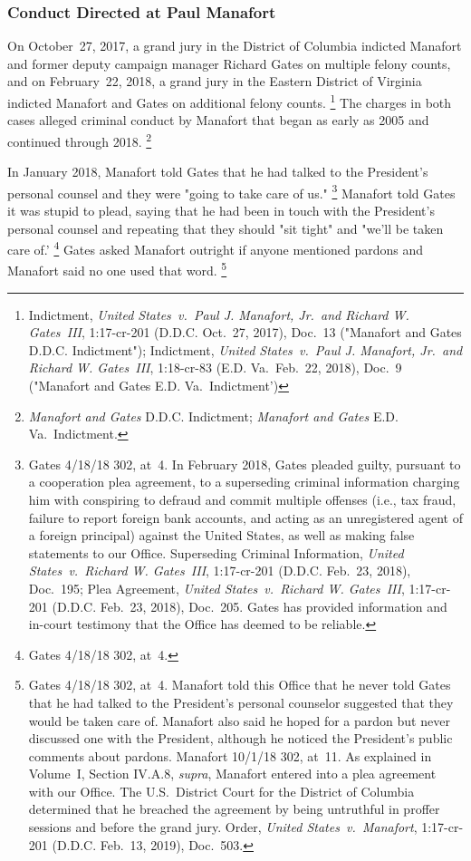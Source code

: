 \subsubsection{Conduct Directed at Paul Manafort}

On October~27, 2017, a grand jury in the District of Columbia indicted Manafort and former deputy campaign manager Richard Gates on multiple felony counts, and on February~22, 2018, a grand jury in the Eastern District of Virginia indicted Manafort and Gates on additional felony counts.%
\footnote{Indictment, \textit{United States~v.\ Paul J. Manafort, Jr.\ and Richard W. Gates~III}, 1:17-cr-201 (D.D.C. Oct.~27, 2017), Doc.~13 ("Manafort and Gates D.D.C. Indictment");
Indictment, \textit{United States~v.\ Paul J. Manafort, Jr.\ and Richard W. Gates~III}, 1:18-cr-83 (E.D. Va.\ Feb.~22, 2018), Doc.~9 ("Manafort and Gates E.D. Va.\ Indictment')}
The charges in both cases alleged criminal conduct by Manafort that began as early as 2005 and continued through 2018.%
\footnote{\textit{Manafort and Gates} D.D.C. Indictment; \textit{Manafort and Gates} E.D. Va.\ Indictment.}

In January 2018, Manafort told Gates that he had talked to the President's personal counsel and they were "going to take care of us."%
\footnote{Gates 4/18/18 302, at~4.
In February 2018, Gates pleaded guilty, pursuant to a cooperation plea agreement, to a superseding criminal information charging him with conspiring to defraud and commit multiple offenses (i.e., tax fraud, failure to report foreign bank accounts, and acting as an unregistered agent of a foreign principal) against the United States, as well as making false statements to our Office.
Superseding Criminal Information, \textit{United States~v.\ Richard W. Gates~III}, 1:17-cr-201 (D.D.C. Feb.~23, 2018), Doc.~195;
Plea Agreement, \textit{United States~v.\ Richard W. Gates~III}, 1:17-cr-201 (D.D.C. Feb.~23, 2018), Doc.~205.
Gates has provided information and in-court testimony that the Office has deemed to be reliable.}
Manafort told Gates it was stupid to plead, saying that he had been in touch with the President's personal counsel and repeating that they should "sit tight" and "we'll be taken care of.'%
\footnote{Gates 4/18/18 302, at~4.}
Gates asked Manafort outright if anyone mentioned pardons and Manafort said no one used that word.%
\footnote{Gates 4/18/18 302, at~4.
Manafort told this Office that he never told Gates that he had talked to the President's personal counselor suggested that they would be taken care of.
Manafort also said he hoped for a pardon but never discussed one with the President, although he noticed the President's public comments about pardons.
Manafort 10/1/18 302, at~11.
As explained in Volume~I, Section IV.A.8, \textit{supra}, Manafort entered into a plea agreement with our Office.
The U.S.~District Court for the District of Columbia determined that he breached the agreement by being untruthful in proffer sessions and before the grand jury.
Order, \textit{United States~v.\ Manafort}, 1:17-cr-201 (D.D.C. Feb.~13, 2019), Doc.~503.}

